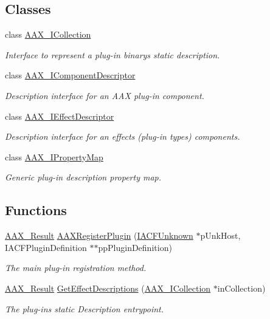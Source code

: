  \subsection*{Classes}
\begin{DoxyCompactItemize}
\item 
class \hyperlink{a00087}{A\+A\+X\+\_\+\+I\+Collection}
\begin{DoxyCompactList}\small\item\em Interface to represent a plug-\/in binary\textquotesingle{}s static description. \end{DoxyCompactList}\item 
class \hyperlink{a00088}{A\+A\+X\+\_\+\+I\+Component\+Descriptor}
\begin{DoxyCompactList}\small\item\em Description interface for an A\+A\+X plug-\/in component. \end{DoxyCompactList}\item 
class \hyperlink{a00096}{A\+A\+X\+\_\+\+I\+Effect\+Descriptor}
\begin{DoxyCompactList}\small\item\em Description interface for an effect\textquotesingle{}s (plug-\/in type\textquotesingle{}s) components. \end{DoxyCompactList}\item 
class \hyperlink{a00112}{A\+A\+X\+\_\+\+I\+Property\+Map}
\begin{DoxyCompactList}\small\item\em Generic plug-\/in description property map. \end{DoxyCompactList}\end{DoxyCompactItemize}
\subsection*{Functions}
\begin{DoxyCompactItemize}
\item 
\hyperlink{a00149_a4d8f69a697df7f70c3a8e9b8ee130d2f}{A\+A\+X\+\_\+\+Result} \hyperlink{a00326_ga83d05333118598c179ca6d89487fa203}{A\+A\+X\+Register\+Plugin} (\hyperlink{a00146}{I\+A\+C\+F\+Unknown} $\ast$p\+Unk\+Host, I\+A\+C\+F\+Plugin\+Definition $\ast$$\ast$pp\+Plugin\+Definition)
\begin{DoxyCompactList}\small\item\em The main plug-\/in registration method. \end{DoxyCompactList}\item 
\hyperlink{a00149_a4d8f69a697df7f70c3a8e9b8ee130d2f}{A\+A\+X\+\_\+\+Result} \hyperlink{a00326_gae0d356eef326f77cbb972e48946d4892}{Get\+Effect\+Descriptions} (\hyperlink{a00087}{A\+A\+X\+\_\+\+I\+Collection} $\ast$in\+Collection)
\begin{DoxyCompactList}\small\item\em The plug-\/in\textquotesingle{}s static Description entrypoint. \end{DoxyCompactList}\end{DoxyCompactItemize}


